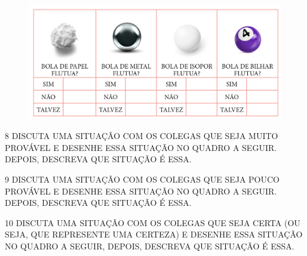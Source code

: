 \begin{figure}[htpb!]
\includegraphics[width=\textwidth]{./media/SAEB_1ANO_MAT_FIGURA90.png}
\end{figure}


\num{8} DISCUTA UMA SITUAÇÃO COM OS COLEGAS QUE SEJA MUITO PROVÁVEL E DESENHE
ESSA SITUAÇÃO NO QUADRO A SEGUIR. DEPOIS, DESCREVA QUE SITUAÇÃO É ESSA.

\begin{mdframed}[linewidth=2pt,linecolor=salmao,roundcorner=10pt]
\vspace{17cm}
\end{mdframed}


\num{9} DISCUTA UMA SITUAÇÃO COM OS COLEGAS QUE SEJA POUCO PROVÁVEL E DESENHE
ESSA SITUAÇÃO NO QUADRO A SEGUIR. DEPOIS, DESCREVA QUE SITUAÇÃO É ESSA.

\begin{mdframed}[linewidth=2pt,linecolor=salmao,roundcorner=10pt]
\vspace{19cm}
\end{mdframed}


\num{10} DISCUTA UMA SITUAÇÃO COM OS COLEGAS QUE SEJA CERTA (OU SEJA, QUE REPRESENTE UMA CERTEZA) E DESENHE ESSA SITUAÇÃO NO QUADRO A SEGUIR, DEPOIS, DESCREVA QUE SITUAÇÃO É ESSA.


